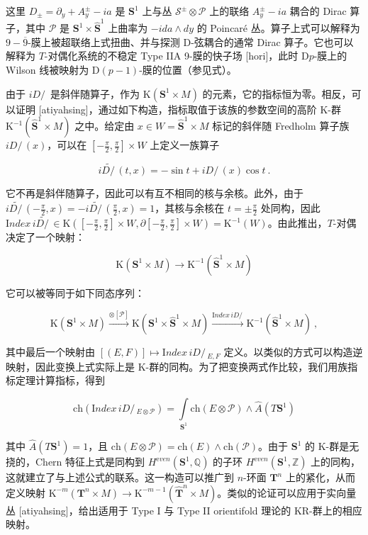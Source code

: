 \documentclass[11pt,a4paper]{ctexart}
\begin{document}
这里 \(D_\pm=\partial_y+A^\pm_y-ia\) 是 \({\mathbf S}^1\) 上与丛 \({\mathcal S}^\pm\otimes{\mathcal P}\) 上的联络 \(A^\pm_y-ia\) 耦合的 Dirac 算子，其中 \({\mathcal P}\) 是 \({\mathbf S}^1\times
\widehat{\mathbf S}^1\) 上曲率为 \(-ida\wedge dy\) 的 Poincaré 丛。算子上式可以解释为 \(9-\overline{9}\)-膜上被超联络上式扭曲、并与探测 D-弦耦合的通常 Dirac 算子。它也可以解释为 \(T\)-对偶化系统的不稳定 Type IIA 9-膜的快子场 [hori]，此时 D\(p\)-膜上的 Wilson 线被映射为 D\((p-1)\)-膜的位置（参见式）。

由于 \(iD/\,\) 是斜伴随算子，作为 \({\mathrm K}({\mathbf S}^1\times M)\) 的元素，它的指标恒为零。相反，可以证明 [atiyahsing]，通过如下构造，指标取值于该族的参数空间的高阶 K-群 \({\mathrm K}^{-1}(\widehat{\mathbf S}^1\times M)\) 之中。给定由 \(x\in W=\widehat{\mathbf S}^1\times M\) 标记的斜伴随 Fredholm 算子族 \(iD/\,(x)\)，可以在 \([-\frac{\pi}{2},\frac{\pi}{2}]\times W\) 上定义一族算子

\[i\widetilde{D/\,}(t,x)=-\sin t+iD/\,(x)\cos t\ .\]

它不再是斜伴随算子，因此可以有互不相同的核与余核。此外，由于 \(i\widetilde{D/\,}
(-\frac{\pi}{2},x)=-i\widetilde{D/\,}(\frac{\pi}{2},x)=1\)，其核与余核在 \(t=\pm\frac{\pi}{2}\) 处同构，因此 \({\mathrm Index}\,i\widetilde{D/\,}\in{\mathrm K}([-\frac{\pi}{2},\frac{\pi}{2}]\times W,
\partial[-\frac{\pi}{2},\frac{\pi}{2}]\times W)={\mathrm K}^{-1}(W)\)。由此推出，\(T\)-对偶决定了一个映射：

\[{\mathrm K}({\mathbf S}^1\times M)\longrightarrow{\mathrm K}^{-1}(\widehat{\mathbf S}^1\times M)\]

它可以被等同于如下同态序列：

\[{\mathrm K}({\mathbf S}^1\times M)\stackrel{\otimes[{\mathcal P}]}{\longrightarrow}
{\mathrm K}({\mathbf S}^1\times\widehat{\mathbf S}^1\times M)
\stackrel{{\mathrm Index}\,iD/\,}{\longrightarrow}{\mathrm K}^{-1}(\widehat{\mathbf S}^1\times
M) \ ,\]

其中最后一个映射由 \([(E,F)]\mapsto{\mathrm Index}\,iD/\,_{E,F}\) 定义。以类似的方式可以构造逆映射，因此变换上式实际上是 K-群的同构。为了把变换两式作比较，我们用族指标定理计算指标，得到

\[\mathrm{ch}({\mathrm Index}\,iD/\,_{E\otimes{\mathcal P}})=\int\limits_{{\mathbf S}^1}\mathrm{ch}(E\otimes{\mathcal
P})\wedge
\widehat{A}(T{\mathbf S}^1)\]

其中 \(\widehat{A}(T{\mathbf S}^1)=1\)，且 \(\mathrm{ch}(E\otimes{\mathcal
P})=\mathrm{ch}(E)\wedge\mathrm{ch}({\mathcal P})\)。由于 \({\mathbf S}^1\) 的 K-群是无挠的，Chern 特征上式是同构到 \(H^{\mathrm even}
({\mathbf S}^1,{\mathbb{Q}})\) 的子环 \(H^{\mathrm even}({\mathbf S}^1,{\mathbb{Z}})\) 上的同构，这就建立了与上述公式的联系。这一构造可以推广到 \(n\)-环面 \({\mathbf T}^n\) 上的紧化，从而定义映射 \({\mathrm K}^{-m}({\mathbf T}^n\times M)\longrightarrow
{\mathrm K}^{-m-1}(\widehat{\mathbf T}^n\times M)\)。类似的论证可以应用于实向量丛 [atiyahsing]，给出适用于 Type I 与 Type II orientifold 理论的 KR-群上的相应映射。
\end{document}
